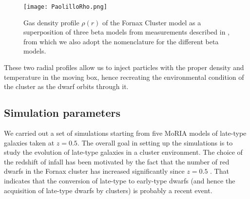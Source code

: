 \begin{figure}
\centering
\texttt{[image: PaolilloRho.png]}
\caption{Gas density profile $\rho(r)$ of the  Fornax Cluster model as a superposition of three beta models from measurements described in \citet{Paolillo2002}, from which we also adopt the nomenclature for the different beta models.
}
\label{fig:profiles}
\end{figure}

These two radial profiles allow us to inject particles with the proper density and temperature in the moving box, hence recreating the environmental condition of the cluster as the dwarf orbits through it.

\subsection{Simulation parameters}
We carried out a set of simulations starting from five MoRIA models of late-type galaxies taken at $z = 0.5$.
The overall goal in setting up the simulations is to study the evolution of late-type galaxies in a cluster environment.
The choice of the redshift of infall has been motivated by the fact that the number of red dwarfs in the Fornax cluster has increased significantly since $z = 0.5$ \citep{Stott2007, DeRijcke2010}.
That indicates that the conversion of late-type to early-type dwarfs (and hence the acquisition of late-type dwarfs by clusters) is probably a recent event.

